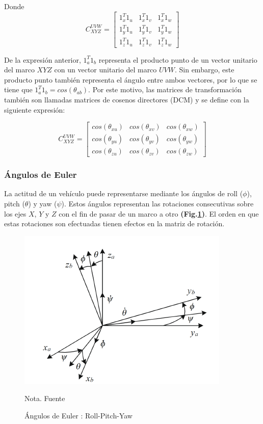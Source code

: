 Donde
$$
C_{XYZ}^{UVW} = \left[\begin{array}{ccc}
	1_x^{T}1_u & 1_x^{T}1_v & 1_x^{T}1_w\\
	1_y^{T}1_u & 1_y^{T}1_v & 1_y^{T}1_w\\
	1_z^{T}1_u & 1_z^{T}1_v & 1_z^{T}1_w
\end{array}\right]
$$

De la expresión anterior, $1_{a}^{T}1_b$ representa el producto punto de un vector unitario del marco $XYZ$ con un vector unitario del marco $UVW$. Sin embargo, este producto punto también representa el ángulo entre ambos vectores, por lo que se tiene que $1_a^{T}1_b = cos\left(\theta_{ab}\right)$. Por este motivo, las matrices de transformación también son llamadas matrices de cosenos directores (DCM) y se define con la siguiente expresión:

$$
C_{XYZ}^{UVW} = \left[\begin{array}{ccc}
	cos\left(\theta_{xu}\right) &cos\left(\theta_{xv}\right) & cos\left(\theta_{xw}\right)\\
	cos\left(\theta_{yu}\right) &cos\left(\theta_{yv}\right) & cos\left(\theta_{yw}\right)\\
	cos\left(\theta_{zu}\right) &cos\left(\theta_{zv}\right) & cos\left(\theta_{zw}\right)
\end{array}\right]
$$
	

\subsubsection{Ángulos de Euler}
\hfill \break
La actitud de un vehículo puede representarse mediante los ángulos de roll ($\phi$), pitch ($\theta$) y yaw ($\psi$). Estos ángulos representan las rotaciones consecutivas sobre los ejes $X$, $Y$ y $Z$ con el fin de pasar de un marco a otro \textbf{(Fig.\ref{fig:angulosEuler})}. El orden en que estas rotaciones son efectuadas tienen efectos en la matriz de rotación.



\begin{figure}[!ht]
	\begin{center}
		\includegraphics[scale=0.8]{imagenes/marco_teorico/angulos_euler.PNG}\\
	\end{center}
	\caption{ Ángulos de Euler : Roll-Pitch-Yaw }
	\label{fig:angulosEuler}
	\footnotesize{Nota. Fuente \cite{tes:Sorolla2019}}
\end{figure}

